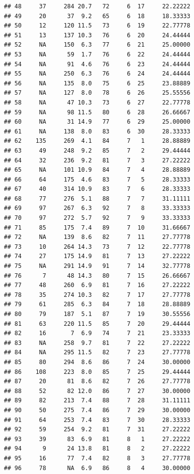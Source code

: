 \documentclass[11pt,]{book}
\begin{document}
\begin{verbatim}
## 48     37     284 20.7   72     6  17     22.22222
## 49     20      37  9.2   65     6  18     18.33333
## 50     12     120 11.5   73     6  19     22.77778
## 51     13     137 10.3   76     6  20     24.44444
## 52     NA     150  6.3   77     6  21     25.00000
## 53     NA      59  1.7   76     6  22     24.44444
## 54     NA      91  4.6   76     6  23     24.44444
## 55     NA     250  6.3   76     6  24     24.44444
## 56     NA     135  8.0   75     6  25     23.88889
## 57     NA     127  8.0   78     6  26     25.55556
## 58     NA      47 10.3   73     6  27     22.77778
## 59     NA      98 11.5   80     6  28     26.66667
## 60     NA      31 14.9   77     6  29     25.00000
## 61     NA     138  8.0   83     6  30     28.33333
## 62    135     269  4.1   84     7   1     28.88889
## 63     49     248  9.2   85     7   2     29.44444
## 64     32     236  9.2   81     7   3     27.22222
## 65     NA     101 10.9   84     7   4     28.88889
## 66     64     175  4.6   83     7   5     28.33333
## 67     40     314 10.9   83     7   6     28.33333
## 68     77     276  5.1   88     7   7     31.11111
## 69     97     267  6.3   92     7   8     33.33333
## 70     97     272  5.7   92     7   9     33.33333
## 71     85     175  7.4   89     7  10     31.66667
## 72     NA     139  8.6   82     7  11     27.77778
## 73     10     264 14.3   73     7  12     22.77778
## 74     27     175 14.9   81     7  13     27.22222
## 75     NA     291 14.9   91     7  14     32.77778
## 76      7      48 14.3   80     7  15     26.66667
## 77     48     260  6.9   81     7  16     27.22222
## 78     35     274 10.3   82     7  17     27.77778
## 79     61     285  6.3   84     7  18     28.88889
## 80     79     187  5.1   87     7  19     30.55556
## 81     63     220 11.5   85     7  20     29.44444
## 82     16       7  6.9   74     7  21     23.33333
## 83     NA     258  9.7   81     7  22     27.22222
## 84     NA     295 11.5   82     7  23     27.77778
## 85     80     294  8.6   86     7  24     30.00000
## 86    108     223  8.0   85     7  25     29.44444
## 87     20      81  8.6   82     7  26     27.77778
## 88     52      82 12.0   86     7  27     30.00000
## 89     82     213  7.4   88     7  28     31.11111
## 90     50     275  7.4   86     7  29     30.00000
## 91     64     253  7.4   83     7  30     28.33333
## 92     59     254  9.2   81     7  31     27.22222
## 93     39      83  6.9   81     8   1     27.22222
## 94      9      24 13.8   81     8   2     27.22222
## 95     16      77  7.4   82     8   3     27.77778
## 96     78      NA  6.9   86     8   4     30.00000

\end{verbatim}
\end{document}
